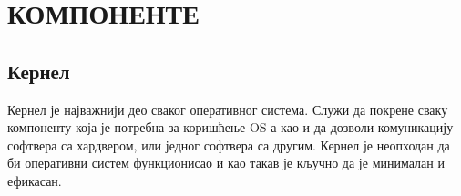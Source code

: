 \documentclass[a4paper,14pt]{article}
\begin{document}
\begin{figure}[h]
	\centering
    \hspace{1cm}
    \hspace{1cm}
    \hspace{1cm}
\end{figure}
\newpage

\section{КОМПОНЕНТЕ}
\subsection{Кернел}
Кернел\cite{kernel} је најважнији део сваког оперативног система. Служи да покрене сваку компоненту која је потребна за коришћење OS-а као и да дозволи комуникацију софтвера са хардвером, или једног софтвера са другим. Кернел је неопходан да би оперативни систем функционисао и као такав је кључно да је минималан и ефикасан.
\end{document}
